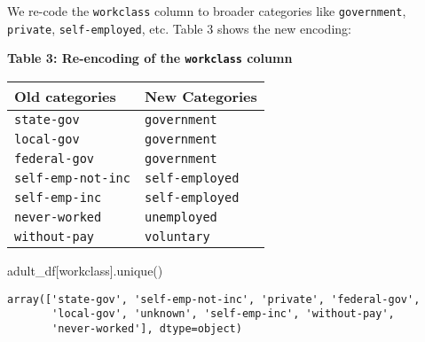 \documentclass[
  letterpaper,
  DIV=11,
  numbers=noendperiod]{scrartcl}
\newenvironment{Shaded}{\begin{snugshade}}{\end{snugshade}}
\newcommand{\NormalTok}[1]{\textcolor[rgb]{0.00,0.23,0.31}{#1}}
\newcommand{\StringTok}[1]{\textcolor[rgb]{0.13,0.47,0.30}{#1}}
\begin{document}
We re-code the \texttt{workclass} column to broader categories like
\texttt{government}, \texttt{private}, \texttt{self-employed}, etc.
Table 3 shows the new encoding:

\textbf{Table 3: Re-encoding of the \texttt{workclass} column}

\begin{longtable}[]{@{}ll@{}}
\toprule\noalign{}
Old categories & New Categories \\
\midrule\noalign{}
\endhead
\bottomrule\noalign{}
\endlastfoot
\texttt{state-gov} & \texttt{government} \\
\texttt{local-gov} & \texttt{government} \\
\texttt{federal-gov} & \texttt{government} \\
\texttt{self-emp-not-inc} & \texttt{self-employed} \\
\texttt{self-emp-inc} & \texttt{self-employed} \\
\texttt{never-worked} & \texttt{unemployed} \\
\texttt{without-pay} & \texttt{voluntary} \\
\end{longtable}

\begin{Shaded}
\begin{Highlighting}[]
\NormalTok{adult\_df[}\StringTok{\textquotesingle{}workclass\textquotesingle{}}\NormalTok{].unique()}
\end{Highlighting}
\end{Shaded}

\begin{verbatim}
array(['state-gov', 'self-emp-not-inc', 'private', 'federal-gov',
       'local-gov', 'unknown', 'self-emp-inc', 'without-pay',
       'never-worked'], dtype=object)
\end{verbatim}
\end{document}
